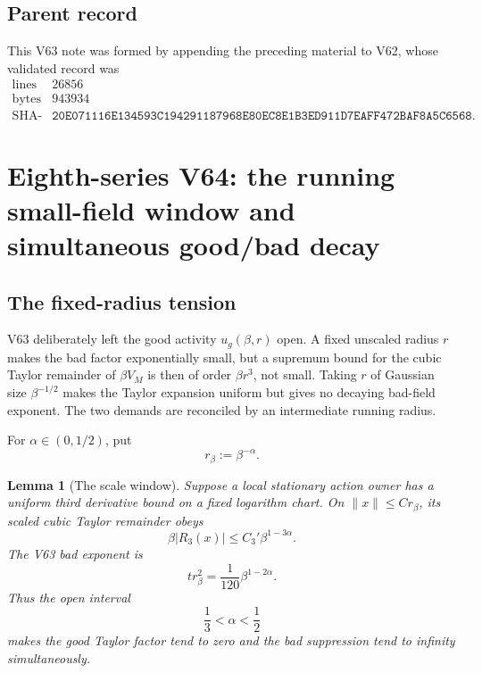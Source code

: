 \documentclass[11pt,oneside]{book}
\newtheorem{lemma}[theorem]{Lemma}
\theoremstyle{definition}
\theoremstyle{remark}
\begin{document}
\subsection{Parent record}

This V63 note was formed by appending the preceding material to V62,
whose validated record was
\[
\begin{array}{c|c}
\text{lines}&26856\\
\text{bytes}&943934\\
\text{SHA-256}&
\texttt{20E071116E134593C194291187968E80EC8E1B3ED911D7EAFF472BAF8A5C6568}.
\end{array}
\]



\section{Eighth-series V64: the running small-field window and
simultaneous good/bad decay}
\label{sec:e8v64}

\subsection{The fixed-radius tension}

V63 deliberately left the good activity \(u_g(\beta,r)\) open.  A
fixed unscaled radius \(r\) makes the bad factor exponentially
small, but a supremum bound for the cubic Taylor remainder of
\(\beta V_M\) is then of order \(\beta r^3\), not small.  Taking
\(r\) of Gaussian size \(\beta^{-1/2}\) makes the Taylor expansion
uniform but gives no decaying bad-field exponent.  The two demands
are reconciled by an intermediate running radius.

For \(\alpha\in(0,1/2)\), put
\[
                         r_\beta:=\beta^{-\alpha}.            \tag{64.1}
\]

\begin{lemma}[The scale window]
\label{lem:e8v64-scale-window}
Suppose a local stationary action owner has a uniform third
derivative bound on a fixed logarithm chart.  On
\(\|x\|\le C r_\beta\), its scaled cubic Taylor remainder obeys
\[
                  \beta|R_3(x)|\le C_3'\beta^{1-3\alpha}.    \tag{64.2}
\]
The V63 bad exponent is
\[
                         t r_\beta^2
                         =\frac1{120}\beta^{1-2\alpha}.      \tag{64.3}
\]
Thus the open interval
\[
                         \boxed{\frac13<\alpha<\frac12}      \tag{64.4}
\]
makes the good Taylor factor tend to zero and the bad suppression
tend to infinity simultaneously.
\end{lemma}
\end{document}
